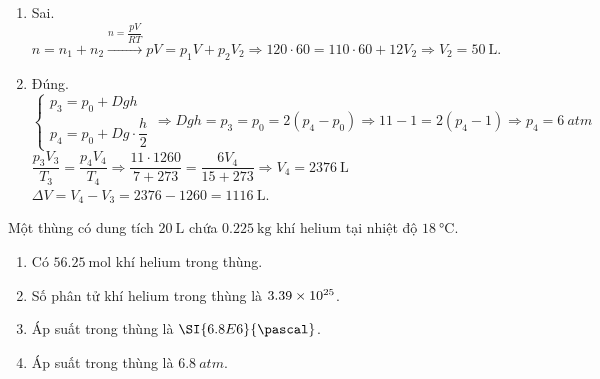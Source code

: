 \begin{ex}
{\begin{enumerate}[label=\alph*)]
		\item Sai. $n=n_1+n_2\xrightarrow{n=\dfrac{pV}{RT}}pV=p_1V+p_2V_2\Rightarrow 120\cdot60=110\cdot60+12V_2\Rightarrow V_2=\SI{50}{\liter}$.
		\item Đúng. \\
		$\begin{cases}
			p_3=p_0+Dgh\\
			p_4=p_0+Dg\cdot\dfrac{h}{2}
		\end{cases}\Rightarrow Dgh=p_3=p_0=2\left(p_4-p_0\right)\Rightarrow 11-1=2\left(p_4-1\right)\Rightarrow p_4=\SI{6}{atm}$\\
		$\dfrac{p_3V_3}{T_3}=\dfrac{p_4V_4}{T_4}\Rightarrow\dfrac{11\cdot1260}{7+273}=\dfrac{6V_4}{15+273}\Rightarrow V_4=\SI{2376}{\liter}$\\
		$\Delta V=V_4-V_3=2376-1260=\SI{1116}{\liter}$.
	\end{enumerate}
	}
\end{ex}
\begin{ex}
	Một thùng có dung tích $\SI{20}{\liter}$ chứa $\SI{0.225}{\kilogram}$ khí helium tại nhiệt độ $\SI{18}{\celsius}$.
	\begin{enumerate}[label=\alph*)]
		\item Có $\SI{56.25}{\mole}$ khí helium trong thùng.
		\item Số phân tử khí helium trong thùng là $\SI{3.39E25}{}$.
		\item Áp suất trong thùng là $\SI{6.8E6}{\pascal}$.
		\item Áp suất trong thùng là $\SI{6.8}{atm}$.
	\end{enumerate}
\end{ex}
